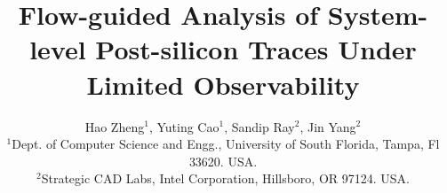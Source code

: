 \documentclass[conference]{IEEEtran}
\begin{document}
%
\title{\Large {\bf Flow-guided Analysis of System-level Post-silicon
  Traces Under Limited Observability}}

\author{\large Hao Zheng$^1$, Yuting Cao$^1$, Sandip Ray$^2$, Jin Yang$^2$ \\
$^1$Dept. of Computer Science and Engg., University of South Florida, Tampa, Fl 33620. USA. \\
$^2$Strategic CAD Labs, Intel Corporation, Hillsboro, OR 97124.  USA.}
\maketitle



% 
\end{document}
